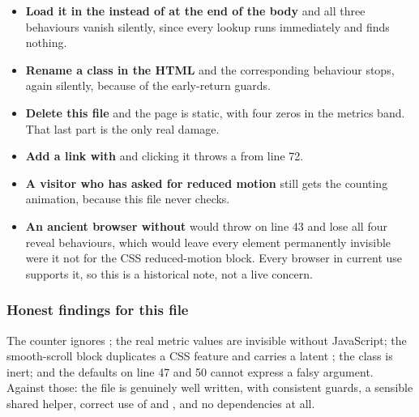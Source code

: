 \begin{itemize}
\item \textbf{Load it in the  instead of at the end of the body} and
  all three behaviours vanish silently, since every lookup runs immediately and
  finds nothing.
\item \textbf{Rename a class in the HTML} and the corresponding behaviour stops,
  again silently, because of the early-return guards.
\item \textbf{Delete this file} and the page is static, with four zeros in the
  metrics band. That last part is the only real damage.
\item \textbf{Add a link with } and clicking it throws a
   from line 72.
\item \textbf{A visitor who has asked for reduced motion} still gets the counting
  animation, because this file never checks.
\item \textbf{An ancient browser without } would throw
  on line 43 and lose all four reveal behaviours, which would leave every
   element permanently invisible were it not for the CSS
  reduced-motion block. Every browser in current use supports it, so this is a
  historical note, not a live concern.
\end{itemize}

\subsubsection*{Honest findings for this file}

The counter ignores ; the real metric values are
invisible without JavaScript; the smooth-scroll block duplicates a CSS feature and
carries a latent ; the  class is inert; and the
\code{||} defaults on line 47 and 50 cannot express a falsy argument. Against
those: the file is genuinely well written, with consistent guards, a sensible
shared helper, correct use of  and , and no
dependencies at all.
